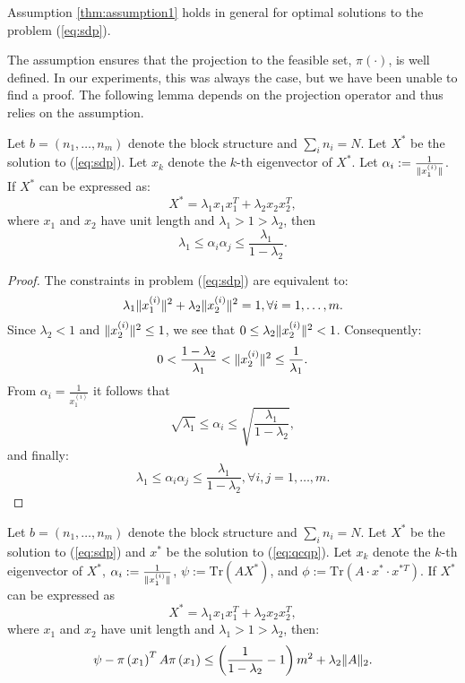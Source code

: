 \begin{conjecture}\label{thm:conj1}
Assumption \ref{thm:assumption1} holds in general for optimal solutions 
to the problem (\ref{eq:sdp}).
\end{conjecture}

The assumption ensures that the projection to the feasible set,
$\pi(\cdot)$, is well defined. In our experiments, this was always
the case, but we have been unable to find a proof. 
The following lemma depends on the projection
operator and thus relies on the assumption.

\begin{lemma}
Let $b = \left(n_1,\ldots,n_m\right)$ denote the block structure and $ \sum_i n_i = N $.
Let $X^*$ be the solution to (\ref{eq:sdp}).
Let $x_k$ denote the $k$-th eigenvector of $X^*$.
Let $\alpha_i := \frac{1}{\lVert x_1^{(i)}\rVert}$.
If $X^*$ can be expressed as:
$$X^* = \lambda_1  x_1 x_1^T + \lambda_2 x_2 x_2^T,$$
where $x_1$ and $x_2$ have unit length and $\lambda_1 > 1 >  \lambda_2$, then
$$\lambda_1 \leq \alpha_i \alpha_j  \leq \frac{\lambda_1}{1 - \lambda_2}.$$
\end{lemma}

\begin{proof}
The constraints in problem (\ref{eq:sdp}) are equivalent to:
$$\lambda_1 \lVert x_1^{(i)}\rVert^2 + \lambda_2 \lVert x_2^{(i)}\rVert^2 = 1, \forall i = 1,\ldots, m.$$
Since $\lambda_2 < 1$ and $\lVert x_2^{(i)}\rVert^2 \leq 1$, 
we see that $0 \leq \lambda_2 \lVert x_2^{(i)}\rVert^2  < 1$.
Consequently:
$$  0 < \frac{1- \lambda_2}{\lambda_1} < \lVert x_2^{(i)}\rVert^2 \leq \frac{1}{\lambda_1}.$$
From $\alpha_i = \frac{1}{x_1^{(i)}}$ it follows that 
$$ \sqrt{\lambda_1} \leq \alpha_i \leq \sqrt{\frac{\lambda_1}{1-\lambda_2}},$$
and finally:
$$ \lambda_1 \leq \alpha_i \alpha_j \leq \frac{\lambda_1}{1-\lambda_2}, \forall i,j = 1,\ldots,m.$$
\end{proof}

\begin{proposition}\label{thm:rank2sdp_solution}
Let $b = \left(n_1,\ldots,n_m\right)$ denote the block structure and $ \sum_i n_i = N $.
Let $X^*$ be the solution to (\ref{eq:sdp}) and $x^{*}$ be the solution to  (\ref{eq:qcqp}).
Let $x_k$ denote the $k$-th eigenvector of $X^*$, $\alpha_i := \frac{1}{\lVert x_1^{(i)}\rVert}$,
$\psi := \mathrm{Tr}\left(A X^{*}\right)$, and $\phi := \mathrm{Tr}\left(A \cdot x^{*} \cdot x^{*T}\right)$.
If $X^*$ can be expressed as
$$X^* = \lambda_1  x_1 x_1^T + \lambda_2 x_2 x_2^T,$$
where $x_1$ and $x_2$ have unit length and $\lambda_1 > 1 >  \lambda_2$,
 then: $$\psi - \pi\left(x_1\right)^T A \pi\left(x_1\right) \leq \left(\frac{1}{1-\lambda_2} -1\right)  m^2 + \lambda_2 \lVert A\rVert_2.$$
\end{proposition}

